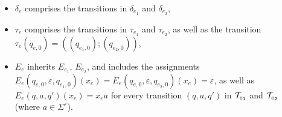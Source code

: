 \begin{itemize}
			\item $\delta_e$ comprises the transitions in $\delta_{e_1}$ and $\delta_{e_2}$,
			\item $\tau_e$ comprises the transitions in $\tau_{e_1}$ and $\tau_{e_2}$, as well as the transition $\tau_e(q_{e,0}) = ((q_{e_1,0}); (q_{e_2,0}))$,
			\item $E_e$ inherits $E_{e_1}$, $E_{e_2}$, and includes the assignments $E_e(q_{e,0}, \varepsilon, q_{e_1,0})(x_{e}) = E_e(q_{e,0}, \varepsilon, q_{e_2,0})(x_{e}) =\varepsilon$, as well as $E_e(q,a, q')(x_{e}) = x_e a$ for every transition $(q, a, q')$ in $\mathcal{T}_{e_1}$ and $\mathcal{T}_{e_2}$ (where $a \in \Sigma^\varepsilon$).
\end{itemize}
